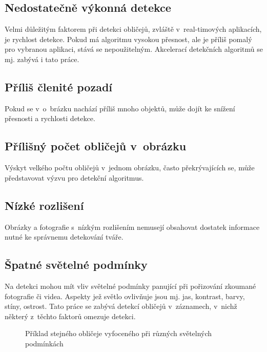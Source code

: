 \subsection*{Nedostatečně výkonná detekce}
Velmi důležitým faktorem při detekci obličejů, zvláště v~real-timových aplikacích, je rychlost detekce. Pokud má algoritmu vysokou přesnost, ale je příliš pomalý pro vybranou aplikaci, stává se nepoužitelným. Akcelerací detekčních algoritmů se mj. zabývá i tato práce.

\subsection*{Příliš členité pozadí} 
Pokud se v~o~brázku nachází příliš mnoho objektů, může dojít ke snížení přesnosti a rychlosti detekce.

\subsection*{Přílišný počet obličejů v~obrázku}
Výskyt velkého počtu obličejů v~jednom obrázku, často překrývajících se, může představovat výzvu pro detekční algoritmus. 

\subsection*{Nízké rozlišení}
Obrázky a fotografie s~nízkým rozlišením nemusejí obsahovat dostatek informace nutné ke správnemu detekování tváře.

\subsection*{Špatné světelné podmínky}
Na detekci mohou mít vliv světelné podmínky panující při pořizování zkoumané fotografie či videa. Aspekty jež světlo ovlivňuje jsou mj. jas, kontrast, barvy, stíny, ostrost. Tato práce se zabývá detekcí obličejů v~záznamech, v~nichž některý z~těchto faktorů omezuje detekci.


\begin{figure}[H]
  \begin{center}
  \label{illuminationexample}
  \caption{Příklad stejného obličeje vyfoceného při různých světelných podmínkách \cite{feature-based-fd-review}}
  \end{center}
\end{figure}

